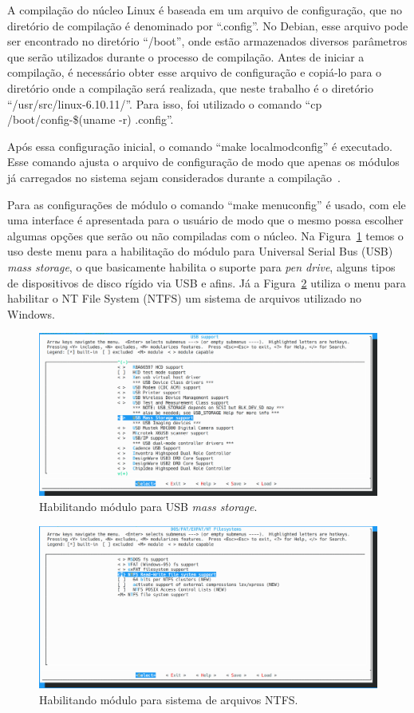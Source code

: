 \documentclass[
	12pt,				%
	oneside,   	        %
	a4paper,			%
	english,			%
	french,				%
	spanish,			%
	brazil,				%
	]{pacotes/abntex2}
\begin{document}
A compilação do núcleo Linux é baseada em um arquivo de configuração, que no diretório de compilação é denominado por ``.config''. No Debian, esse arquivo pode ser encontrado no diretório ``/boot'', onde estão armazenados diversos parâmetros que serão utilizados durante o processo de compilação. Antes de iniciar a compilação, é necessário obter esse arquivo de configuração e copiá-lo para o diretório onde a compilação será realizada, que neste trabalho é o diretório ``/usr/src/linux-6.10.11/''. Para isso, foi utilizado o comando ``cp /boot/config-\$(uname -r) .config''.

Após essa configuração inicial, o comando ``make localmodconfig'' é executado. Esse comando ajusta o arquivo de configuração de modo que apenas os módulos já carregados no sistema sejam considerados durante a compilação~\cite{kernelConfig}.

Para as configurações de módulo o comando ``make menuconfig'' é usado, com ele uma interface é apresentada para o usuário de modo que o mesmo possa escolher algumas opções que serão ou não compiladas com o núcleo. Na Figura~\ref{fig:usb} temos o uso deste menu para a habilitação do módulo para Universal Serial Bus (USB) \textit{mass storage}, o que basicamente habilita o suporte para \textit{pen drive}, alguns tipos de dispositivos de disco rígido via USB e afins. Já a Figura~\ref{fig:ntfs} utiliza o menu para habilitar o NT File System (NTFS) um sistema de arquivos utilizado no Windows.

\begin{figure}[H]
  \centering
  \includegraphics[scale=0.3]{figuras/usb.png}
  \caption{Habilitando módulo para USB \textit{mass storage}.}
  \label{fig:usb}
\end{figure}

\begin{figure}[H]
  \centering
  \includegraphics[scale=0.3]{figuras/ntfs.png}
  \caption{Habilitando módulo para sistema de arquivos NTFS.}
  \label{fig:ntfs}
\end{figure}
\end{document}
